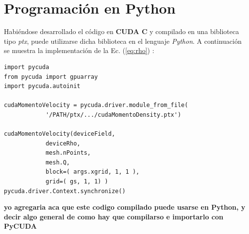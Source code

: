 \section{Programación en Python}

Habiéndose desarrollado el código en \textbf{CUDA C} y compilado en una biblioteca tipo \textit{ptx}, puede utilizarse dicha biblioteca en el lenguaje \textit{Python}. A continuación se muestra la implementación de la Ec. (\ref{eq:rho}) :

{\footnotesize
	\begin{frame}{}
		\begin{lstlisting}[frame=single]
import pycuda
from pycuda import gpuarray
import pycuda.autoinit
		
cudaMomentoVelocity = pycuda.driver.module_from_file(
			'/PATH/ptx/.../cudaMomentoDensity.ptx')		
			
cudaMomentoVelocity(deviceField,
			deviceRho,
			mesh.nPoints,
			mesh.Q,
			block=( args.xgrid, 1, 1 ),
			grid=( gs, 1, 1) )          
pycuda.driver.Context.synchronize()
		\end{lstlisting}
		
	\end{frame}
}


\textbf{yo agregaria aca que este codigo compilado puede usarse en Python, y decir algo general de como hay que compilarso e importarlo con PyCUDA}


